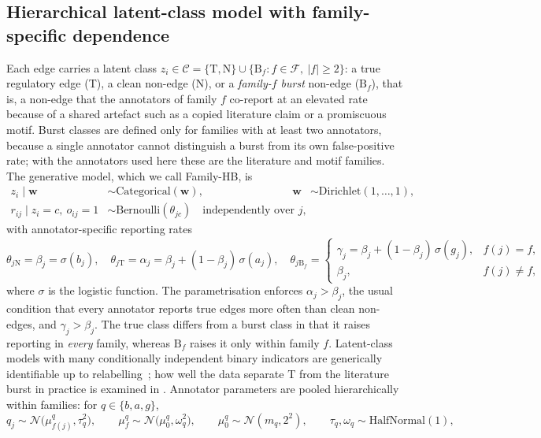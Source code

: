 \subsection{Hierarchical latent-class model with family-specific dependence}\label{sec:model}
Each edge carries a latent class $z_i\in\mathcal{C}=\{\mathrm{T},\mathrm{N}\}\cup\{\mathrm{B}_f: f\in\mathcal{F},\ |f|\ge 2\}$: a true regulatory edge (T), a clean non-edge (N), or a \emph{family-$f$ burst} non-edge ($\mathrm{B}_f$), that is, a non-edge that the annotators of family $f$ co-report at an elevated rate because of a shared artefact such as a copied literature claim or a promiscuous motif.
Burst classes are defined only for families with at least two annotators, because a single annotator cannot distinguish a burst from its own false-positive rate; with the annotators used here these are the literature and motif families.
The generative model, which we call Family-HB, is
\begin{align}
  z_i \mid \mathbf{w} &\sim \mathrm{Categorical}(\mathbf{w}), & \mathbf{w}&\sim\mathrm{Dirichlet}(1,\dots,1), \label{eq:class}\\
  r_{ij}\mid z_i=c,\ o_{ij}=1 &\sim \mathrm{Bernoulli}(\theta_{jc}) \quad\text{independently over } j, \label{eq:emission}
\end{align}
with annotator-specific reporting rates
\begin{equation}
  \theta_{j\mathrm{N}}=\beta_j=\sigma(b_j),\quad
  \theta_{j\mathrm{T}}=\alpha_j=\beta_j+(1-\beta_j)\,\sigma(a_j),\quad
  \theta_{j\mathrm{B}_f}=\begin{cases}\gamma_j=\beta_j+(1-\beta_j)\,\sigma(g_j), & f(j)=f,\\ \beta_j, & f(j)\neq f,\end{cases}
  \label{eq:rates}
\end{equation}
where $\sigma$ is the logistic function.
The parametrisation enforces $\alpha_j>\beta_j$, the usual condition that every annotator reports true edges more often than clean non-edges, and $\gamma_j>\beta_j$.
The true class differs from a burst class in that it raises reporting in \emph{every} family, whereas $\mathrm{B}_f$ raises it only within family $f$. Latent-class models with many conditionally independent binary indicators are generically identifiable up to relabelling~\citep{allman2009identifiability}; how well the data separate T from the literature burst in practice is examined in .
Annotator parameters are pooled hierarchically within families: for $q\in\{b,a,g\}$,
\begin{equation}
  q_j \sim \mathcal{N}\big(\mu^{q}_{f(j)},\tau_q^2\big),\qquad
  \mu^{q}_{f}\sim\mathcal{N}\big(\mu^{q}_0,\omega_q^2\big),\qquad
  \mu^{q}_0\sim\mathcal{N}(m_q,2^2),\qquad
  \tau_q,\omega_q\sim\mathrm{HalfNormal}(1),
  \label{eq:hier}
\end{equation}
